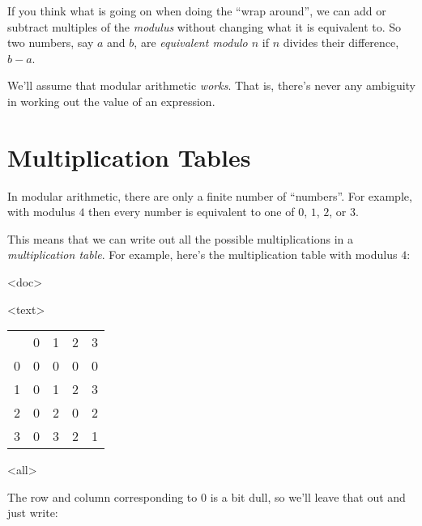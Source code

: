 \documentclass[
  html5,
  mathml,
  use filename
]{internet}
\begin{document}
If you think what is going on when doing the ``wrap around'', we can add or subtract multiples of the \emph{modulus} without changing what it is equivalent to.
So two numbers, say \(a\) and \(b\), are \emph{equivalent modulo \(n\)} if \(n\) divides their difference, \(b - a\).

We'll assume that modular arithmetic \emph{works}.
That is, there's never any ambiguity in working out the value of an expression.

\section{Multiplication Tables}

In modular arithmetic, there are only a finite number of ``numbers''.
For example, with modulus \(4\) then every number is equivalent to one of \(0\), \(1\), \(2\), or \(3\).

This means that we can write out all the possible multiplications in a \emph{multiplication table}.
For example, here's the multiplication table with modulus \(4\):

\begin{center}
\imode
<doc>
\imode
<text>
\begin{tabular}{ccccc}
& 0 & 1 & 2 & 3 \\
0 & 0 & 0 & 0 & 0 \\
1 & 0 & 1 & 2 & 3 \\
2 & 0 & 2 & 0 & 2 \\
3 & 0 & 3 & 2 & 1 
\end{tabular}
\imode
<all>
\end{center}

The row and column corresponding to \(0\) is a bit dull, so we'll leave that out and just write:
\end{document}
